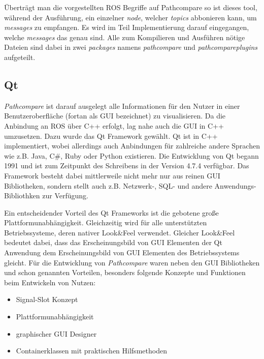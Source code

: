 Überträgt man die vorgestellten ROS Begriffe auf Pathcompare so ist
dieses tool, während der Ausführung,
ein einzelner \textit{node}, welcher \textit{topics} abbonieren kann, um
\textit{messages} zu empfangen. Es wird im Teil Implementierung darauf
eingegangen, welche \textit{messages} das genau sind. Alle zum Kompilieren und
Ausführen nötige Dateien sind dabei in zwei \textit{packages} namens
\textit{pathcompare} und \textit{pathcompareplugins} aufgeteilt.

\subsection{Qt}

\textit{Pathcompare} ist darauf ausgelegt alle Informationen für den Nutzer in
einer Benutzeroberfläche (fortan als GUI bezeichnet) zu visualisieren.
Da die Anbindung an ROS über C++ erfolgt, lag nahe auch die GUI in C++
umzusetzen. Dazu wurde das Qt Framework gewählt. Qt ist in C++ implementiert, wobei
allerdings auch Anbindungen für zahlreiche andere Sprachen wie z.B.
Java, C\#, Ruby oder Python existieren. Die Entwicklung von Qt begann 1991 und
ist zum Zeitpunkt des Schreibens in der Version 4.7.4 verfügbar. Das Framework besteht dabei
mittlerweile nicht mehr nur aus reinen GUI Bibliotheken, sondern stellt auch
z.B. Netzwerk-, SQL- und andere Anwendungs-Bibliothken zur Verfügung.

Ein entscheidender Vorteil des Qt Frameworks ist die gebotene große
Plattformunabhängigkeit.
Gleichzeitig wird für alle unterstützten Betriebssysteme, deren nativer Look\&Feel
verwendet. Gleicher Look\&Feel bedeutet dabei, dass das Erscheinungsbild von GUI Elementen der
Qt Anwendung dem Erscheinungsbild von GUI Elementen des Betriebssystems
gleicht.
Für die Entwicklung von \textit{Pathcompare} waren neben den GUI Bibliotheken
und schon genannten Vorteilen,
besonders folgende Konzepte und Funktionen beim Entwickeln von Nutzen: 

\begin{itemize}
  \item Signal-Slot Konzept
  \item Plattformunabhängigkeit
  \item graphischer GUI Designer 
  \item Containerklassen mit praktischen Hilfsmethoden
\end{itemize}

